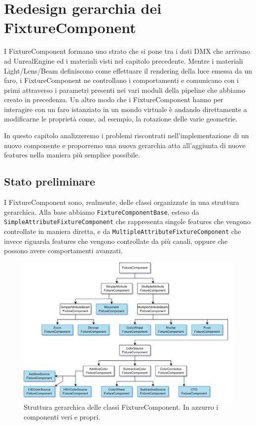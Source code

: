 \documentclass[main.tex]{subfiles}
\begin{document}
\sloppy


\vspace{1.0cm}

\section{Redesign gerarchia dei FixtureComponent}\label{sec:FixtureComponentHierachy}
I FixtureComponent formano uno strato che si pone tra i dati DMX che arrivano ad UnrealEngine ed i materiali visti nel capitolo precedente. Mentre i materiali Light/Lens/Beam definiscono come effettuare il rendering della luce emessa da un faro, i FixtureComponent ne controllano i comportamenti e comunicano con i primi attraverso i parametri presenti nei vari moduli della pipeline che abbiamo creato in precedenza. Un altro modo che i FixtureComponent hanno per interagire con un faro istanziato in un mondo virtuale è andando direttamente a modificarne le proprietà come, ad esempio, la rotazione delle varie geometrie. \newline

In questo capitolo analizzeremo i problemi riscontrati nell'implementazione di un nuovo componente e proporremo una nuova gerarchia atta all'aggiunta di nuove features nella maniera più semplice possibile.

\subsection{Stato preliminare}\label{subsec:3_oldImplementation}
I FixtureComponent sono, realmente, delle classi organizzate in una struttura gerarchica. Alla base abbiamo \lstinline{FixtureComponentBase}, esteso da \lstinline{SimpleAttributeFixtureComponent} che rappresenta singole features che vengono controllate in maniera diretta, e da \lstinline{MultipleAttributeFixtureComponent} che invece riguarda features che vengono controllate da più canali, oppure che possono avere comportamenti avanzati.
\begin{figure}[H]
    \centering
    \includegraphics[width=0.9\linewidth]{img/fixtureComponent/FixtureComponentOLD.drawio.png}
    \caption{Struttura gerarchica delle classi FixtureComponent. In azzurro i componenti veri e propri.}
    \label{fig:3_fixtureComponentOld}
\end{figure}
\end{document}
